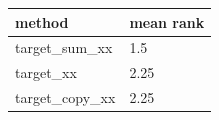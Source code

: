 \begin{tabular}{ll}
\toprule
method & mean rank \\
\midrule
target\_sum\_xx & 1.5 \\
target\_xx & 2.25 \\
target\_copy\_xx & 2.25 \\
\bottomrule
\end{tabular}
